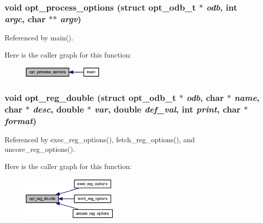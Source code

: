 \subsubsection[{opt\_\-process\_\-options}]{\setlength{\rightskip}{0pt plus 5cm}void opt\_\-process\_\-options (struct {\bf opt\_\-odb\_\-t} $\ast$ {\em odb}, \/  int {\em argc}, \/  char $\ast$$\ast$ {\em argv})}\label{options_8h_d342c32672b6463f360141b0faf981ad}




Referenced by main().

Here is the caller graph for this function:\nopagebreak
\begin{figure}[H]
\begin{center}
\leavevmode
\includegraphics[width=112pt]{options_8h_d342c32672b6463f360141b0faf981ad_icgraph}
\end{center}
\end{figure}
\subsubsection[{opt\_\-reg\_\-double}]{\setlength{\rightskip}{0pt plus 5cm}void opt\_\-reg\_\-double (struct {\bf opt\_\-odb\_\-t} $\ast$ {\em odb}, \/  char $\ast$ {\em name}, \/  char $\ast$ {\em desc}, \/  double $\ast$ {\em var}, \/  double {\em def\_\-val}, \/  int {\em print}, \/  char $\ast$ {\em format})}\label{options_8h_8b67f54a697dd1f6ad5936220a80b6de}




Referenced by exec\_\-reg\_\-options(), fetch\_\-reg\_\-options(), and uncore\_\-reg\_\-options().

Here is the caller graph for this function:\nopagebreak
\begin{figure}[H]
\begin{center}
\leavevmode
\includegraphics[width=132pt]{options_8h_8b67f54a697dd1f6ad5936220a80b6de_icgraph}
\end{center}
\end{figure}
